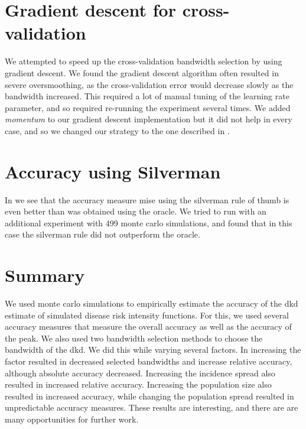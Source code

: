 \section{Gradient descent for cross-validation}
\label{sec:discussion:gradient_descent}

We attempted to speed up the cross-validation bandwidth selection by using gradient descent.
We found the gradient descent algorithm often resulted in severe oversmoothing,
as the cross-validation error would decrease slowly as the bandwidth increased.
This required a lot of manual tuning of the learning rate parameter, and so required re-running the experiment several times.
We added \textit{momentum} to our gradient descent implementation but it did not help in every case, and so we changed our strategy to the one described in .

\section{Accuracy using Silverman}

In  we see that the accuracy measure \gls{mise} using the \gls{silverman} rule of thumb is even better than was obtained using the \gls{oracle}.
We tried to run with an additional experiment with 499 monte carlo simulations, and found that in this case the \gls{silverman} rule did not outperform the \gls{oracle}.

\section{Summary}

We used monte carlo simulations to empirically estimate the accuracy of the \acrlong{dkd} estimate of simulated disease risk intensity functions.
For this, we used several accuracy measures that measure the overall accuracy as well as the accuracy of the peak.
We also used two bandwidth selection methods to choose the bandwidth of the \gls{dkd}.
We did this while varying several factors.
In  increasing the \gls{factor} resulted in decreased selected bandwidths
and increase relative accuracy, although absolute accuracy decreased.
Increasing the incidence \gls{spread} also resulted in increased relative accuracy.
Increasing the population size also resulted in increased accuracy,
while changing the population \gls{spread} resulted in unpredictable accuracy measures.
These results are interesting,
and there are are many opportunities for further work.


